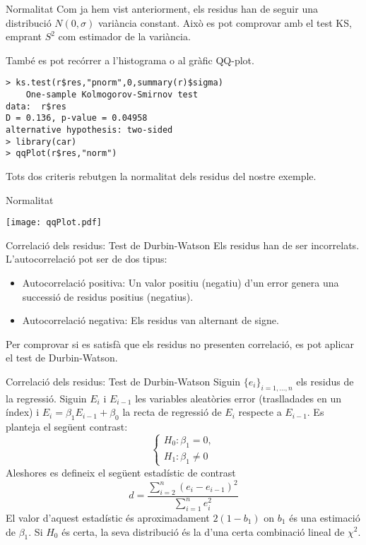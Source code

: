 \documentclass[12pt,t]{beamer}
\renewcommand{\emph}[1]{{\color{red}#1}}
\theoremstyle{plain}
\theoremstyle{definition}
\begin{document}
\begin{frame}[fragile]{Normalitat}
Com ja hem vist anteriorment, els residus han de seguir una distribució $N(0,\sigma)$ variància constant. Això es pot comprovar amb el test KS, emprant $S^2$ com estimador de la variància. 

\vspace{0.25cm}

També es pot recórrer a l'histograma o al gràfic QQ-plot.

\begin{verbatim}
> ks.test(r$res,"pnorm",0,summary(r)$sigma)
	One-sample Kolmogorov-Smirnov test
data:  r$res
D = 0.136, p-value = 0.04958
alternative hypothesis: two-sided
> library(car)
> qqPlot(r$res,"norm")
\end{verbatim}

Tots dos criteris rebutgen la normalitat dels residus del nostre exemple.
\end{frame}



\begin{frame}[fragile]{Normalitat}

\begin{center}
\texttt{[image: qqPlot.pdf]}
\end{center}


\end{frame}

\begin{frame}{Correlació dels residus: Test de Durbin-Watson}
Els residus han de ser incorrelats. L'autocorrelació pot ser de dos tipus:
\begin{itemize}
\item \emph{Autocorrelació positiva}: Un valor positiu (negatiu) d'un error genera una successió de residus positius (negatius).
\item \emph{Autocorrelació negativa}: Els residus van alternant de signe. 
\end{itemize}
Per comprovar si es satisfà que els residus no presenten correlació, es pot aplicar el test de \emph{Durbin-Watson}.

\end{frame}

\begin{frame}{Correlació dels residus: Test de Durbin-Watson}
Siguin $\{e_i\}_{i=1,\ldots,n}$ els residus de la regressió. Siguin $E_i$ i $E_{i-1}$ les variables aleatòries error (traslladades en un índex) i $E_i=\beta_1E_{i-1}+\beta_0$ la recta de regressió de $E_i$ respecte a $E_{i-1}$. Es planteja el següent contrast:
$$\left\{\begin{array}{ll} H_0: \beta_1=0,\\H_1: \beta_1\neq0\end{array}\right.$$
Aleshores es defineix el següent estadístic de contrast
$$d=\frac{\sum^n_{i=2}{(e_i-e_{i-1})^2}}{\sum_{i=1}^n{e_i^2}}$$
El valor d'aquest estadístic és aproximadament $2(1-b_1)$ on $b_1$ és una estimació de $\beta_1$. Si $H_0$ és certa, la seva distribució és la d'una certa combinació lineal de $\chi^2$. 
\end{frame}
\end{document}
